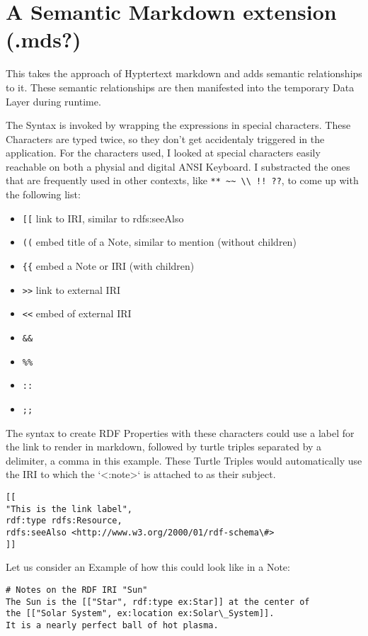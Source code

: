 \section{A Semantic Markdown extension (.mds?)}

This takes the approach of Hyptertext markdown and adds semantic relationships to it. These semantic relationships are then manifested into the temporary Data Layer during runtime.

The Syntax is invoked by wrapping the expressions in special characters. These Characters are typed twice, so they don’t get accidentaly triggered in the application. For the characters used, I looked at special characters easily reachable on both a physial  and digital ANSI Keyboard. I substracted the ones that are frequently used in other contexts, like \verb|** ~~ \\ !! ??|, to come up with the following list:
\begin{itemize}
    \item \verb|[[| link to IRI, similar to rdfs:seeAlso
    \item \verb|((| embed title of a Note, similar to mention (without children)
    \item \verb|{{| embed a Note or IRI (with children)
    \item \verb|>>| link to external IRI
    \item \verb|<<| embed of external IRI
    \item \verb|&&|
    \item \verb|%%|
    \item \verb|::|
    \item \verb|;;|
\end{itemize}

The syntax  to create RDF Properties with these characters could use a label for the link to render  in markdown, followed by turtle triples separated by a delimiter, a comma in this example. These Turtle Triples would automatically use the IRI to which the `<:note>` is attached to as their subject.

\begin{verbatim}
[[
"This is the link label", 
rdf:type rdfs:Resource, 
rdfs:seeAlso <http://www.w3.org/2000/01/rdf-schema\#>
]]
\end{verbatim}

Let us consider an Example of how this could look like in a Note:
\begin{verbatim}
# Notes on the RDF IRI "Sun"
The Sun is the [["Star", rdf:type ex:Star]] at the center of 
the [["Solar System", ex:location ex:Solar\_System]]. 
It is a nearly perfect ball of hot plasma.
\end{verbatim}



